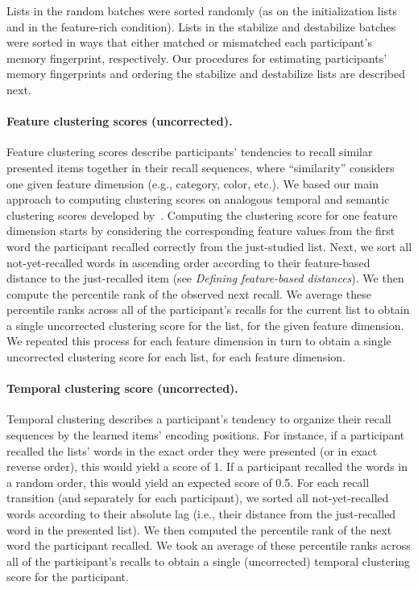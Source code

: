 \documentclass[11pt]{article}
\begin{document}
Lists in the random batches were sorted randomly (as on the initialization
lists and in the feature-rich condition). Lists in the stabilize and
destabilize batches were sorted in ways that either matched or mismatched each
participant's memory fingerprint, respectively. Our procedures for estimating
participants' memory fingerprints and ordering the stabilize and destabilize
lists are described next.

\paragraph*{Feature clustering scores (uncorrected).}

Feature clustering scores describe participants' tendencies to recall similar
presented items together in their recall sequences, where ``similarity''
considers one given feature dimension (e.g., category, color, etc.). We based
our main approach to computing clustering scores on analogous temporal and
semantic clustering scores developed by~\cite{PolyEtal09}. Computing the
clustering score for one feature dimension starts by considering the
corresponding feature values from the first word the participant recalled
correctly from the just-studied list. Next, we sort all not-yet-recalled words
in ascending order according to their feature-based distance to the
just-recalled item (see \textit{Defining feature-based distances}). We then
compute the percentile rank of the observed next recall. We average these
percentile ranks across all of the participant’s recalls for the current list
to obtain a single uncorrected clustering score for the list, for the given
feature dimension. We repeated this process for each feature dimension in turn
to obtain a single uncorrected clustering score for each list, for each feature
dimension.

\paragraph*{Temporal clustering score (uncorrected).}

Temporal clustering describes a participant's tendency to organize their recall
sequences by the learned items' encoding positions. For instance, if a
participant recalled the lists' words in the exact order they were presented
(or in exact reverse order), this would yield a score of 1. If a participant
recalled the words in a random order, this would yield an expected score of
0.5. For each recall transition (and separately for each participant), we
sorted all not-yet-recalled words according to their absolute lag (i.e., their
distance from the just-recalled word in the presented list). We then computed
the percentile rank of the next word the participant recalled. We took an
average of these percentile ranks across all of the participant’s recalls to
obtain a single (uncorrected) temporal clustering score for the participant.
\end{document}
